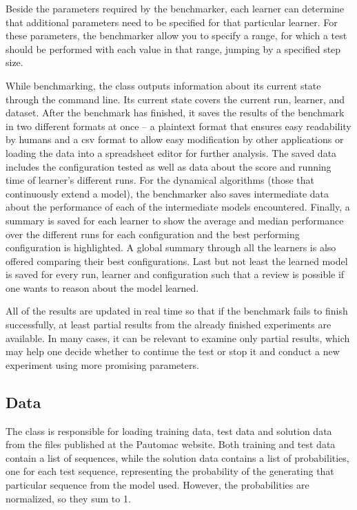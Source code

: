 Beside the parameters required by the benchmarker, each learner can determine that additional parameters need to be specified for that particular learner. For these parameters, the benchmarker allow you to specify a range, for which a test should be performed with each value in that range, jumping by a specified step size.

While benchmarking, the  class outputs information about its current state through the command line. Its current state covers the current run, learner, and dataset. After the benchmark has finished, it saves the results of the benchmark in two different formats at once -- a plaintext format that ensures easy readability by humans and a \gls{csv} format to allow easy modification by other applications or loading the data into a spreadsheet editor for further analysis. The saved data includes the configuration tested as well as data about the score and running time of learner's different runs. For the dynamical algorithms (those that continuously extend a model), the benchmarker also saves intermediate data about the performance of each of the intermediate models encountered. 
Finally, a summary is saved for each learner to show the average and median performance over the different runs for each configuration and the best performing configuration is highlighted. A global summary through all the learners is also offered comparing their best configurations. Last but not least the learned model is saved for every run, learner and configuration such that a review is possible if one wants to reason about the model learned.

All of the results are updated in real time so that if the benchmark fails to finish successfully, at least partial results from the already finished experiments are available. In many cases, it can be relevant to examine only partial results, which may help one decide whether to continue the test or stop it and conduct a new experiment using more promising parameters.

\subsection{Data}
The  class is responsible for loading training data, test data and solution data from the files published at the Pautomac website. Both training and test data contain a list of sequences, while the solution data contains a list of probabilities, one for each test sequence, representing the probability of the generating that particular sequence from the model used. However, the probabilities are normalized, so they sum to 1.


